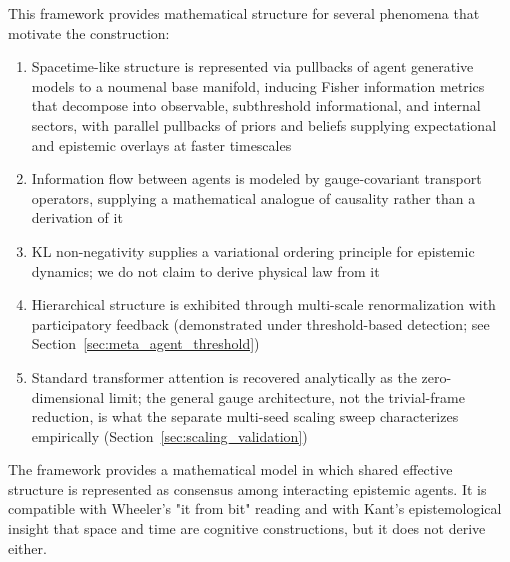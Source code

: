 \documentclass[11pt]{article}
\begin{document}
This framework provides mathematical structure for several phenomena that motivate the construction:
\begin{enumerate}
\item Spacetime-like structure is represented via pullbacks of agent generative models to a noumenal base manifold, inducing Fisher information metrics that decompose into observable, subthreshold informational, and internal sectors, with parallel pullbacks of priors and beliefs supplying expectational and epistemic overlays at faster timescales

\item Information flow between agents is modeled by gauge-covariant transport operators, supplying a mathematical analogue of causality rather than a derivation of it
\item KL non-negativity supplies a variational ordering principle for epistemic dynamics; we do not claim to derive physical law from it
\item Hierarchical structure is exhibited through multi-scale renormalization with participatory feedback (demonstrated under threshold-based detection; see Section~\ref{sec:meta_agent_threshold})
\item Standard transformer attention is recovered analytically as the zero-dimensional limit; the general gauge architecture, not the trivial-frame reduction, is what the separate multi-seed scaling sweep characterizes empirically (Section~\ref{sec:scaling_validation})
\end{enumerate}

The framework provides a mathematical model in which shared effective structure is represented as consensus among interacting epistemic agents. It is compatible with Wheeler's "it from bit" reading and with Kant's epistemological insight that space and time are cognitive constructions, but it does not derive either.
\end{document}
